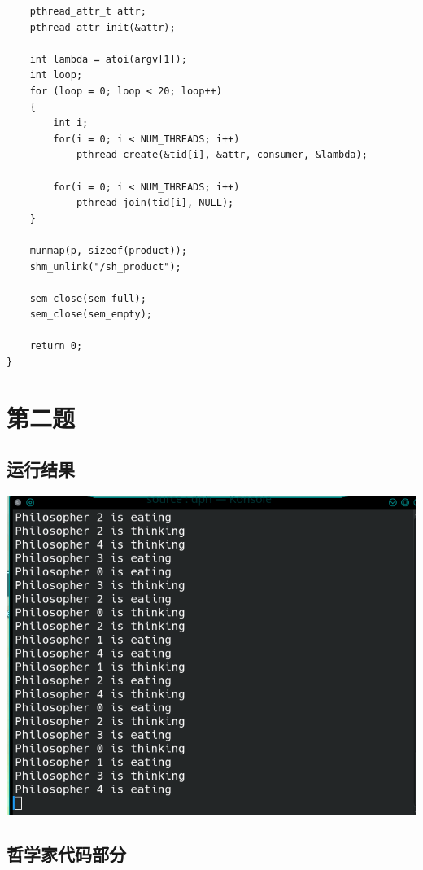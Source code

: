 \documentclass{article}
\begin{document}
\begin{lstlisting}
    pthread_attr_t attr;
    pthread_attr_init(&attr);

    int lambda = atoi(argv[1]);
    int loop;
    for (loop = 0; loop < 20; loop++)
	{
	    int i;
		for(i = 0; i < NUM_THREADS; i++)
	        pthread_create(&tid[i], &attr, consumer, &lambda);

	    for(i = 0; i < NUM_THREADS; i++)
	        pthread_join(tid[i], NULL);
	}

    munmap(p, sizeof(product));
    shm_unlink("/sh_product");

    sem_close(sem_full);
    sem_close(sem_empty);

    return 0;
}
\end{lstlisting}




\section*{第二题}
\subsection{运行结果}
\label{subsec:label}

\includegraphics[scale=0.6]{Philosopher.png}


\subsection{哲学家代码部分}
\label{subsec:label}
\end{document}
